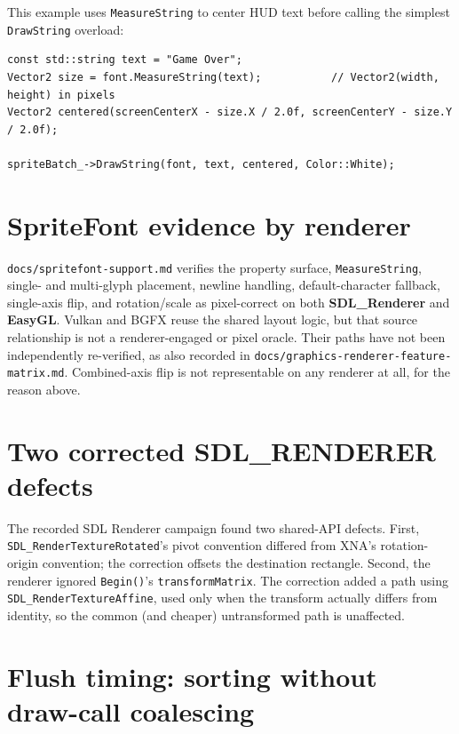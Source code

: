 This example uses \texttt{MeasureString} to center HUD text before calling the simplest
\texttt{DrawString} overload:

\begin{lstlisting}
const std::string text = "Game Over";
Vector2 size = font.MeasureString(text);           // Vector2(width, height) in pixels
Vector2 centered(screenCenterX - size.X / 2.0f, screenCenterY - size.Y / 2.0f);

spriteBatch_->DrawString(font, text, centered, Color::White);
\end{lstlisting}

\section{SpriteFont evidence by renderer}

\texttt{docs/spritefont-support.md} verifies the property surface, \texttt{MeasureString},
single- and multi-glyph placement, newline handling, default-character fallback, single-axis
flip, and rotation/scale as pixel-correct on both \textbf{SDL\_Renderer} and \textbf{EasyGL}.
Vulkan and BGFX reuse the shared layout logic, but that source relationship is not a
renderer-engaged or pixel oracle. Their  paths have not been independently
re-verified, as also recorded in
\texttt{docs/\allowbreak{}graphics-\allowbreak{}renderer-\allowbreak{}feature-\allowbreak{}matrix.md}.
Combined-axis flip is not
representable on any renderer at all, for the  reason above.

\section{Two corrected SDL\_RENDERER defects}
\label{sec:sdl-renderer-two-bugs}

\begin{historynote}
The recorded SDL Renderer campaign found two shared-API defects. First,
\texttt{SDL\_RenderTextureRotated}'s pivot convention differed from XNA's rotation-origin
convention; the correction offsets the destination rectangle. Second, the renderer ignored
\texttt{Begin()}'s \texttt{transformMatrix}. The correction added a path using
\texttt{SDL\_RenderTextureAffine}, used only when the transform actually differs from
identity, so the common (and cheaper) untransformed path is unaffected.
\end{historynote}

\section{Flush timing: sorting without draw-call coalescing}
\label{sec:spritebatch-flush-timing}

